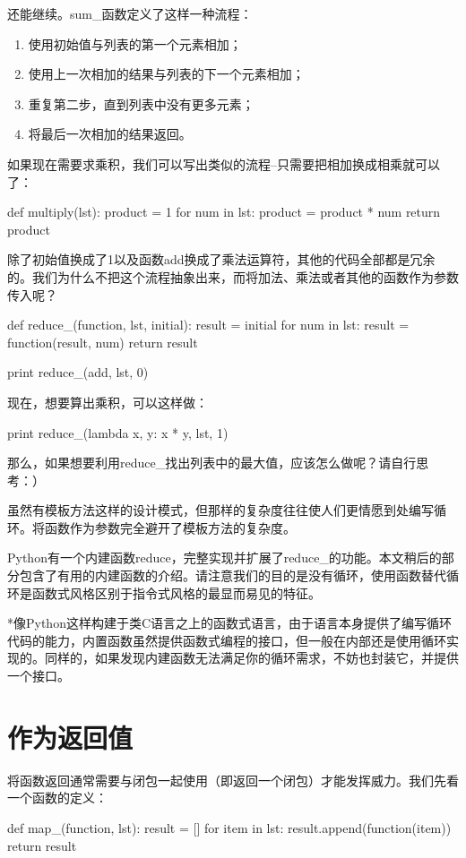 \documentclass[12pt,a4paper]{report}
\begin{document}
还能继续。sum\_函数定义了这样一种流程： 
\begin{enumerate}
    \item 使用初始值与列表的第一个元素相加；
    \item 使用上一次相加的结果与列表的下一个元素相加；
    \item 重复第二步，直到列表中没有更多元素；
    \item 将最后一次相加的结果返回。
\end{enumerate}

如果现在需要求乘积，我们可以写出类似的流程--只需要把相加换成相乘就可以了： 
\begin{python}[moreemph={[4]42},caption={},label=ex1]
def multiply(lst):
    product = 1
    for num in lst:
        product = product * num
    return product
\end{python}

除了初始值换成了1以及函数add换成了乘法运算符，其他的代码全部都是冗余的。我们为什么不把这个流程抽象出来，而将加法、乘法或者其他的函数作为参数传入呢？ 
\begin{python}[moreemph={[4]42},caption={},label=ex1]
def reduce_(function, lst, initial):
    result = initial
    for num in lst:
    result = function(result, num)
    return result
     
print reduce_(add, lst, 0)
\end{python}

现在，想要算出乘积，可以这样做：
\begin{python}[moreemph={[4]42},caption={},label=ex1]
print reduce_(lambda x, y: x * y, lst, 1)
\end{python}

那么，如果想要利用reduce\_找出列表中的最大值，应该怎么做呢？请自行思考：）

虽然有模板方法这样的设计模式，但那样的复杂度往往使人们更情愿到处编写循环。将函数作为参数完全避开了模板方法的复杂度。

Python有一个内建函数reduce，完整实现并扩展了reduce\_的功能。本文稍后的部分包含了有用的内建函数的介绍。请注意我们的目的是没有循环，使用函数替代循环是函数式风格区别于指令式风格的最显而易见的特征。

*像Python这样构建于类C语言之上的函数式语言，由于语言本身提供了编写循环代码的能力，内置函数虽然提供函数式编程的接口，但一般在内部还是使用循环实现的。同样的，如果发现内建函数无法满足你的循环需求，不妨也封装它，并提供一个接口。
\section{作为返回值}
将函数返回通常需要与闭包一起使用（即返回一个闭包）才能发挥威力。我们先看一个函数的定义：
\begin{python}[moreemph={[4]42},caption={},label=ex1]
def map_(function, lst):
    result = []
    for item in lst:
        result.append(function(item))
    return result
\end{python}
\end{document}
